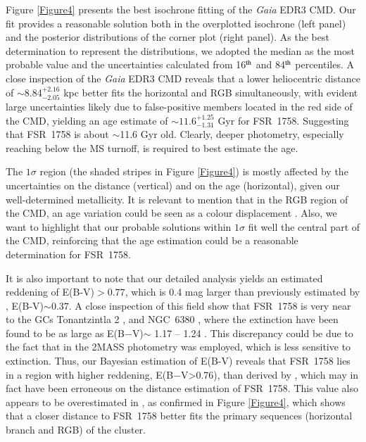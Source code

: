 \documentclass[longauth]{aa} %
\begin{document}
Figure \ref{Figure4} presents the best isochrone fitting of the \textit{Gaia} EDR3 CMD. Our fit provides a reasonable solution both in the overplotted isochrone (left panel) and the posterior distributions of the corner plot (right panel).  As the best determination to represent the distributions, we adopted the median as the most probable value and the uncertainties calculated from 16$^{\rm th}$ and 84$^{\rm th}$ percentiles. A close inspection of the \textit{Gaia} EDR3 CMD reveals that a lower heliocentric distance of $\sim$8.84$^{+2.16}_{-2.05}$ kpc better fits the horizontal and RGB simultaneously, with evident large uncertainties likely due to false-positive members located in the red side of the CMD, yielding an age estimate of $\sim11.6^{+1.25}_{-1.31}$ Gyr for FSR~1758. Suggesting that FSR~1758 is about $\sim$11.6 Gyr old. Clearly, deeper photometry, especially reaching below the MS turnoff, is required to best estimate the age.

The $1\sigma$  region (the shaded stripes in Figure \ref{Figure4}) is mostly affected by the uncertainties on the distance (vertical) and on the age (horizontal), given our well-determined metallicity. It is relevant to mention that in the RGB region of the CMD, an age variation could be seen as a colour displacement \citep[see Figure 2 of ][]{Souza2020}. Also, we want to highlight that our probable solutions within $1\sigma$ fit well the central part of the CMD, reinforcing that the age estimation could be a reasonable determination for FSR~1758.

It is also important to note that our detailed analysis yields an estimated reddening of E(B-V)$>0.77$, which is 0.4 mag larger than previously estimated by \citet{Barba2019}, E(B-V)$\sim0.37$. A close inspection of this field show that FSR~1758 is very near to the GCs Tonantzintla 2 \citep[Ton~2;][]{Bica1996}, and NGC~6380 \citep{Ortolani1998}, where the extinction have been found to be as large as E(B$-$V)$\sim$ 1.17 -- 1.24 \citep[see, e.g.,][]{Bica1996, Ortolani1998}. This discrepancy could be due to the fact that in \citet{Barba2019} the 2MASS photometry was employed, which is less sensitive to extinction. Thus, our Bayesian estimation of E(B-V) reveals that FSR~1758 lies in a region with higher reddening, E(B$-$V>0.76), than derived by \citet{Barba2019}, which may in fact have been erroneous on the distance estimation of FSR~1758. This value also appears to be overestimated in \citet{Barba2019}, as confirmed in Figure \ref{Figure4}, which shows that a closer distance to FSR~1758 better fits the primary sequences  (horizontal branch and RGB) of the cluster.
\end{document}
